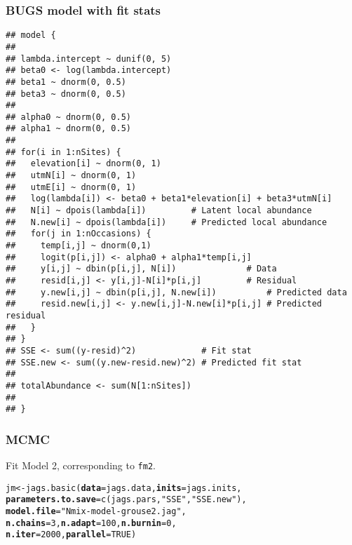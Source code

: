 \documentclass[color=usenames,dvipsnames]{beamer}\usepackage[]{graphicx}\usepackage[]{color}
\makeatletter
\newcommand{\hlnum}[1]{\textcolor[rgb]{0.69,0.494,0}{#1}}%
\newcommand{\hlstr}[1]{\textcolor[rgb]{0.749,0.012,0.012}{#1}}%
\newcommand{\hlstd}[1]{\textcolor[rgb]{0,0,0}{#1}}%
\newcommand{\hlkwb}[1]{\textcolor[rgb]{0,0.341,0.682}{#1}}%
\newcommand{\hlkwc}[1]{\textcolor[rgb]{0,0,0}{\textbf{#1}}}%
\newcommand{\hlkwd}[1]{\textcolor[rgb]{0.004,0.004,0.506}{#1}}%
\newenvironment{kframe}{%
 \def\at@end@of@kframe{}%
 \ifinner\ifhmode%
  \def\at@end@of@kframe{\end{minipage}}%
  \begin{minipage}{\columnwidth}%
 \fi\fi%
 \def\FrameCommand##1{\hskip\@totalleftmargin \hskip-\fboxsep
 \colorbox{shadecolor}{##1}\hskip-\fboxsep
     \hskip-\linewidth \hskip-\@totalleftmargin \hskip\columnwidth}%
 \MakeFramed {\advance\hsize-\width
   \@totalleftmargin\z@ \linewidth\hsize
   \@setminipage}}%
 {\par\unskip\endMakeFramed%
 \at@end@of@kframe}
\newenvironment{knitrout}{}{} %
\newcommand{\inr}[1]{\colorbox{inlinecolor}{\texttt{#1}}}
\makeatother
\begin{document}
\begin{frame}[fragile]
  \frametitle{BUGS model with fit stats}
\begin{knitrout}\tiny
{}\color{fgcolor}\begin{kframe}
\begin{verbatim}
## model {
## 
## lambda.intercept ~ dunif(0, 5)
## beta0 <- log(lambda.intercept)
## beta1 ~ dnorm(0, 0.5)
## beta3 ~ dnorm(0, 0.5)
## 
## alpha0 ~ dnorm(0, 0.5)  
## alpha1 ~ dnorm(0, 0.5)
## 
## for(i in 1:nSites) {
##   elevation[i] ~ dnorm(0, 1)
##   utmN[i] ~ dnorm(0, 1)
##   utmE[i] ~ dnorm(0, 1)
##   log(lambda[i]) <- beta0 + beta1*elevation[i] + beta3*utmN[i]
##   N[i] ~ dpois(lambda[i])         # Latent local abundance
##   N.new[i] ~ dpois(lambda[i])     # Predicted local abundance
##   for(j in 1:nOccasions) {
##     temp[i,j] ~ dnorm(0,1)
##     logit(p[i,j]) <- alpha0 + alpha1*temp[i,j]
##     y[i,j] ~ dbin(p[i,j], N[i])              # Data
##     resid[i,j] <- y[i,j]-N[i]*p[i,j]         # Residual
##     y.new[i,j] ~ dbin(p[i,j], N.new[i])          # Predicted data
##     resid.new[i,j] <- y.new[i,j]-N.new[i]*p[i,j] # Predicted residual
##   }
## }
## SSE <- sum((y-resid)^2)             # Fit stat
## SSE.new <- sum((y.new-resid.new)^2) # Predicted fit stat
## 
## totalAbundance <- sum(N[1:nSites])
## 
## }
\end{verbatim}
\end{kframe}
\end{knitrout}
\end{frame}





\begin{frame}[fragile]
  \frametitle{MCMC}
  Fit Model 2, corresponding to \inr{fm2}. 
  \vspace{-6pt}
\begin{knitrout}\footnotesize
{}\color{fgcolor}\begin{kframe}
\begin{alltt}
\hlstd{jm} \hlkwb{<-} \hlkwd{jags.basic}\hlstd{(}\hlkwc{data}\hlstd{=jags.data,} \hlkwc{inits}\hlstd{=jags.inits,}
                 \hlkwc{parameters.to.save}\hlstd{=}\hlkwd{c}\hlstd{(jags.pars,} \hlstr{"SSE"}\hlstd{,} \hlstr{"SSE.new"}\hlstd{),}
                 \hlkwc{model.file}\hlstd{=}\hlstr{"Nmix-model-grouse2.jag"}\hlstd{,}
                 \hlkwc{n.chains}\hlstd{=}\hlnum{3}\hlstd{,} \hlkwc{n.adapt}\hlstd{=}\hlnum{100}\hlstd{,} \hlkwc{n.burnin}\hlstd{=}\hlnum{0}\hlstd{,}
                 \hlkwc{n.iter}\hlstd{=}\hlnum{2000}\hlstd{,} \hlkwc{parallel}\hlstd{=}\hlnum{TRUE}\hlstd{)}
\end{alltt}
\end{kframe}
\end{knitrout}
\end{frame}
\end{document}
